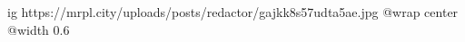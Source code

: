  
 
 
 
 

\ifcmt
  ig https://mrpl.city/uploads/posts/redactor/gajkk8s57udta5ae.jpg
  @wrap center
  @width 0.6
\fi
